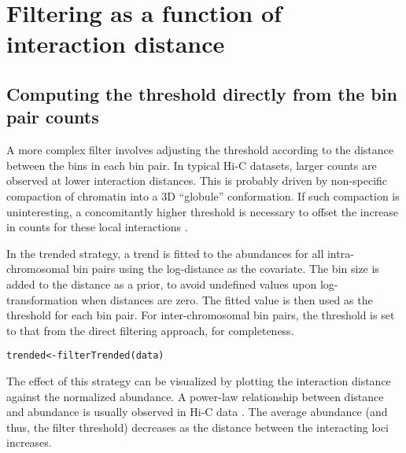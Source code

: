 \documentclass{report}\usepackage[]{graphicx}\usepackage[usenames,dvipsnames]{color}
\newcommand{\hlstd}[1]{\textcolor[rgb]{0.251,0.251,0.251}{#1}}%
\newcommand{\hlkwb}[1]{\textcolor[rgb]{0,0,0}{#1}}%
\newcommand{\hlkwd}[1]{\textcolor[rgb]{0.878,0.439,0.125}{#1}}%
\newenvironment{knitrout}{}{} %
\begin{document}
\section{Filtering as a function of interaction distance}

\subsection{Computing the threshold directly from the bin pair counts}
A more complex filter involves adjusting the threshold according to the distance between the bins in each bin pair. 
In typical Hi-C datasets, larger counts are observed at lower interaction distances.
This is probably driven by non-specific compaction of chromatin into a 3D ``globule'' conformation.
If such compaction is uninteresting, a concomitantly higher threshold is necessary to offset the increase in counts for these local interactions \cite{lin2012global}.

In the trended strategy, a trend is fitted to the abundances for all intra-chromosomal bin pairs using the log-distance as the covariate. 
The bin size is added to the distance as a prior, to avoid undefined values upon log-transformation when distances are zero.
The fitted value is then used as the threshold for each bin pair.
For inter-chromosomal bin pairs, the threshold is set to that from the direct filtering approach, for completeness.

\begin{knitrout}
\color{fgcolor}\begin{kframe}
\begin{alltt}
\hlstd{trended} \hlkwb{<-} \hlkwd{filterTrended}\hlstd{(data)}
\end{alltt}
\end{kframe}
\end{knitrout}

The effect of this strategy can be visualized by plotting the interaction distance against the normalized abundance.
A power-law relationship between distance and abundance is usually observed in Hi-C data \cite{lieberman2009comprehensive}. 
The average abundance (and thus, the filter threshold) decreases as the distance between the interacting loci increases.
\end{document}
